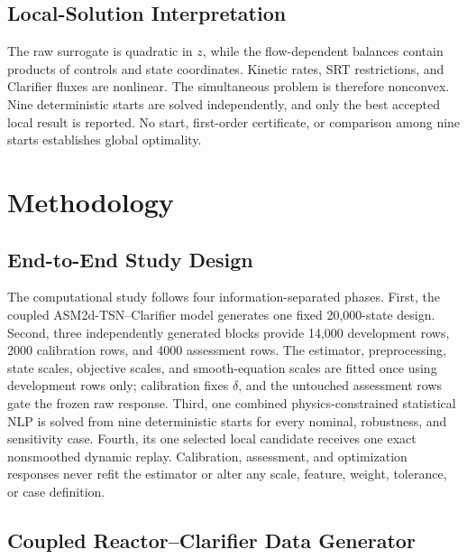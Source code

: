 \documentclass[a4paper,fleqn]{cas-sc}
\begin{document}
\subsection{Local-Solution Interpretation}

The raw surrogate is quadratic in $z$, while the flow-dependent balances contain products of controls and state coordinates. Kinetic rates, SRT restrictions, and Clarifier fluxes are nonlinear. The simultaneous problem is therefore nonconvex. Nine deterministic starts are solved independently, and only the best accepted local result is reported. No start, first-order certificate, or comparison among nine starts establishes global optimality.

\section{Methodology}

\subsection{End-to-End Study Design}

The computational study follows four information-separated phases. First, the coupled ASM2d-TSN--Clarifier model generates one fixed 20,000-state design. Second, three independently generated blocks provide 14,000 development rows, 2000 calibration rows, and 4000 assessment rows. The estimator, preprocessing, state scales, objective scales, and smooth-equation scales are fitted once using development rows only; calibration fixes $\delta$, and the untouched assessment rows gate the frozen raw response. Third, one combined physics-constrained statistical NLP is solved from nine deterministic starts for every nominal, robustness, and sensitivity case. Fourth, its one selected local candidate receives one exact nonsmoothed dynamic replay. Calibration, assessment, and optimization responses never refit the estimator or alter any scale, feature, weight, tolerance, or case definition.

\subsection{Coupled Reactor--Clarifier Data Generator}
\end{document}
